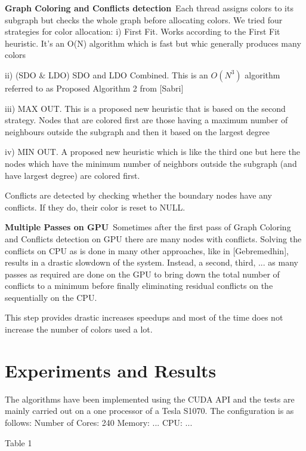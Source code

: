 \documentclass[preprint]{sigplanconf}
\begin{document}
\textbf{Graph Coloring  and Conflicts detection}\
Each thread assigns colors to its subgraph but checks the whole graph before allocating colors. We tried four strategies for color allocation:
i) First Fit. Works according to the First Fit heuristic. It’s an O(N) algorithm which is fast but whic generally produces many colors

ii) (SDO $\&$ LDO) SDO and LDO Combined. This is an $O(N^3)$ algorithm referred to as Proposed Algorithm 2 from [Sabri]

iii) MAX OUT. This is a  proposed new heuristic that is based on the second strategy. Nodes that are colored first are those having a maximum number of neighbours outside the subgraph and then it based on the largest degree

iv) MIN OUT. A proposed new heuristic which is like the third one but here the nodes which have the minimum number of neighbors outside the subgraph (and have largest degree) are colored first.

Conflicts are detected by checking whether the boundary nodes have any conflicts. If they do, their color is reset to NULL.\

\textbf{Multiple Passes on GPU}\
Sometimes after the first pass of Graph Coloring and Conflicts detection on GPU there are many nodes with conflicts. Solving the conflicts on CPU as is done in many other approaches, like in [Gebremedhin], results in a drastic slowdown of the system. Instead, a second, third, ... as many passes as required are done on the GPU to bring down the total number of conflicts to a minimum before finally eliminating residual conflicts on the sequentially on the CPU.

This step provides drastic increases speedups and most of the time does not increase the number of colors used a lot.

\section{Experiments and Results}
The algorithms have been implemented using the CUDA API and the tests are mainly carried out on a  one processor of a Tesla S1070. The configuration is as follows:
Number of Cores: 240
Memory: ...
CPU: ...

Table 1
\end{document}
